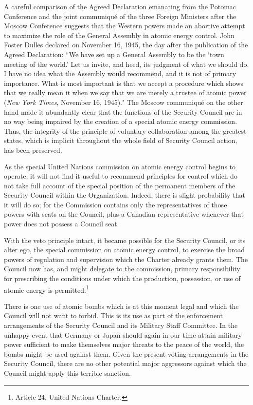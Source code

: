 A careful comparison of the Agreed Declaration emanating from the Potomac Conference and the joint communiqu\'e of the three Foreign Ministers after the Moscow Conference suggests that the Western powers made an abortive attempt to maximize the role of the General Assembly in atomic energy control. John Foster Dulles declared on November 16, 1945, the day after the publication of the Agreed Declaration: ``We have set up a General Assembly to be the `town meeting of the world.' Let us invite, and heed, its judgment of what we should do. I have no idea what the Assembly would recommend, and it is not of primary importance. What is most important is that we accept a procedure which shows that we really mean it when we say that we are merely a trustee of atomic power (\textit{New York Times}, November 16, 1945)." The Moscow communiqu\'e on the other hand made it abundantly clear that the functions of the Security Council are in no way being impaired by the creation of a special atomic energy commission. Thus, the integrity of the principle of voluntary collaboration among the greatest states, which is implicit throughout the whole field of Security Council action, has been preserved.

As the special United Nations commission on atomic energy control begins to operate, it will not find it useful to recommend principles for control which do not take full account of the special position of the permanent members of the Security Council within the Organization. Indeed, there is slight probability that it will do so; for the Commission contains only the representatives of those powers with seats on the Council, plus a Canadian representative whenever that power does not possess a Council seat.

With the veto principle intact, it became possible for the Security Council, or its alter ego, the special commission on atomic energy control, to exercise the broad powers of regulation and supervision which the Charter already grants them. The Council now has, and might delegate to the commission, primary responsibility for prescribing the conditions under which the production, possession, or use of atomic energy is permitted.\footnote{Article 24, United Nations Charter.}

There is one use of atomic bombs which is at this moment legal and which the Council will not want to forbid. This is its use as part of the enforcement arrangements of the Security Council and its Military Staff Committee. In the unhappy event that Germany or Japan should again in our time attain military power sufficient to make themselves major threats to the peace of the world, the bombs might be used against them. Given the present voting arrangements in the Security Council, there are no other potential major aggressors against which the Council might apply this terrible sanction.


